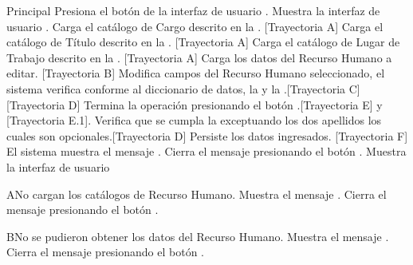 \begin{UCtrayectoria}{Principal}
    \UCpaso[\UCactor] Presiona el botón  de la interfaz de usuario .
    \UCpaso Muestra la interfaz de usuario .
    \UCpaso Carga el catálogo de Cargo descrito en la . [Trayectoria A]
    \UCpaso Carga el catálogo de Título descrito en la . [Trayectoria A]
    \UCpaso Carga el catálogo de Lugar de Trabajo descrito en la . [Trayectoria A]
    \UCpaso Carga los datos del Recurso Humano a editar. [Trayectoria B]
    \UCpaso[\UCactor] Modifica campos del Recurso Humano seleccionado, el sistema verifica conforme al diccionario de datos, la  y la .[Trayectoria C][Trayectoria D]
    \UCpaso[\UCactor] Termina la operación presionando el botón .[Trayectoria E] y [Trayectoria E.1].
    \UCpaso Verifica que se cumpla la  exceptuando los dos apellidos los cuales son opcionales.[Trayectoria D]
    \UCpaso Persiste los datos ingresados. [Trayectoria F]
    \UCpaso El sistema muestra el mensaje .
    \UCpaso[\UCactor] Cierra el mensaje presionando el botón .
    \UCpaso Muestra la interfaz de usuario 
\end{UCtrayectoria}
\begin{UCtrayectoriaA}{A}{No cargan los catálogos de Recurso Humano.}
    \UCpaso Muestra el mensaje .
    \UCpaso[\UCactor] Cierra el mensaje presionando el botón .
\end{UCtrayectoriaA}
\begin{UCtrayectoriaA}{B}{No se pudieron obtener los datos del Recurso Humano.}
    \UCpaso Muestra el mensaje .
    \UCpaso[\UCactor] Cierra el mensaje presionando el botón .
\end{UCtrayectoriaA}
